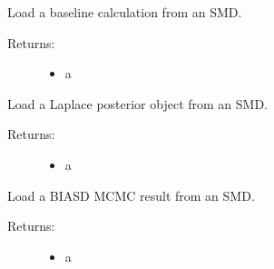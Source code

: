 \documentclass[letterpaper,10pt,english]{sphinxmanual}
\begin{document}
\begin{fulllineitems}
\label{code_smd:smd.read.baseline}
Load a baseline calculation from an SMD.
\begin{description}
\item[{Returns:}] \leavevmode\begin{itemize}
\item {} 
a 

\end{itemize}

\end{description}

\end{fulllineitems}


\begin{fulllineitems}
\label{code_smd:smd.read.laplace_posterior}
Load a Laplace posterior object from an SMD.
\begin{description}
\item[{Returns:}] \leavevmode\begin{itemize}
\item {} 
a 

\end{itemize}

\end{description}

\end{fulllineitems}


\begin{fulllineitems}
\label{code_smd:smd.read.mcmc}
Load a BIASD MCMC result from an SMD.
\begin{description}
\item[{Returns:}] \leavevmode\begin{itemize}
\item {} 
a 

\end{itemize}

\end{description}

\end{fulllineitems}
\end{document}
